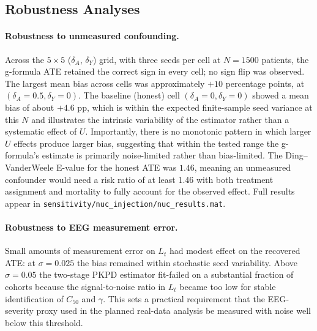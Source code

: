 \subsection{Robustness Analyses}
\label{sec:robustness}

\paragraph{Robustness to unmeasured confounding.}
Across the \(5 \times 5\) (\(\delta_A\), \(\delta_Y\)) grid, with three seeds per cell at
\(N = 1500\) patients, the g-formula ATE retained the correct sign in every cell; no
sign flip was observed. The largest mean bias across cells was approximately
\(+10\) percentage points, at \((\delta_A = 0.5, \delta_Y = 0)\). The baseline (honest)
cell \((\delta_A = 0, \delta_Y = 0)\) showed a mean bias of about \(+4.6\) pp, which is
within the expected finite-sample seed variance at this \(N\) and illustrates the
intrinsic variability of the estimator rather than a systematic effect of \(U\).
Importantly, there is no monotonic pattern in which larger \(U\) effects produce larger
bias, suggesting that within the tested range the g-formula's estimate is primarily
noise-limited rather than bias-limited. The Ding--VanderWeele E-value for the honest ATE
was \(1.46\), meaning an unmeasured confounder would need a risk ratio of at least 1.46
with both treatment assignment and mortality to fully account for the observed effect.
Full results appear in \texttt{sensitivity/nuc\_injection/nuc\_results.mat}.

\paragraph{Robustness to EEG measurement error.}
Small amounts of measurement error on \(L_t\) had modest effect on the recovered ATE: at
\(\sigma = 0.025\) the bias remained within stochastic seed variability. Above
\(\sigma = 0.05\) the two-stage PKPD estimator fit-failed on a substantial fraction of
cohorts because the signal-to-noise ratio in \(L_t\) became too low for stable
identification of \(C_{50}\) and \(\gamma\). This sets a practical requirement that the
EEG-severity proxy used in the planned real-data analysis be measured with noise well
below this threshold.

